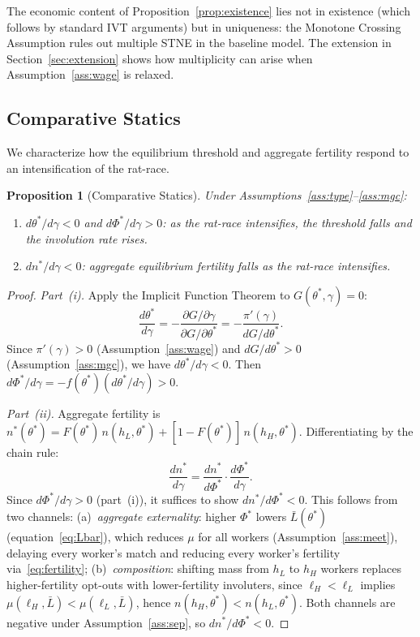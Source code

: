 \documentclass[12pt]{article}
\theoremstyle{plain}
\newtheorem{proposition}{Proposition}
\theoremstyle{definition}
\theoremstyle{remark}
\newcommand{\tstar}{\theta^{*}}
\newcommand{\Lbar}{\bar{L}}
\newcommand{\hH}{h_{H}}
\newcommand{\hL}{h_{L}}
\newcommand{\ellH}{\ell_{H}}
\newcommand{\ellL}{\ell_{L}}
\newcommand{\Phistar}{\Phi^{*}}
\begin{document}
The economic content of Proposition~\ref{prop:existence} lies not in existence (which
follows by standard IVT arguments) but in uniqueness: the Monotone Crossing
Assumption rules out multiple STNE in the baseline model.  The extension in
Section~\ref{sec:extension} shows how multiplicity can arise when
Assumption~\ref{ass:wage} is relaxed.

\subsection{Comparative Statics}

We characterize how the equilibrium threshold and aggregate fertility respond to an
intensification of the rat-race.

\begin{proposition}[Comparative Statics]
\label{prop:cs}
Under Assumptions~\ref{ass:type}--\ref{ass:mgc}:
\begin{enumerate}
  \item[\textup{(i)}] $d\tstar/d\gamma < 0$ and $d\Phistar/d\gamma > 0$:
    as the rat-race intensifies, the threshold falls and the involution rate rises.
  \item[\textup{(ii)}] $dn^{*}/d\gamma < 0$:
    aggregate equilibrium fertility falls as the rat-race intensifies.
\end{enumerate}
\end{proposition}

\begin{proof}
\emph{Part~(i).}  Apply the Implicit Function Theorem to $G(\tstar,\gamma) = 0$:
\[
  \frac{d\tstar}{d\gamma}
  = -\frac{\partial G/\partial\gamma}{\partial G/\partial\tstar}
  = -\frac{\pi'(\gamma)}{dG/d\tstar}.
\]
Since $\pi'(\gamma) > 0$ (Assumption~\ref{ass:wage}) and $dG/d\tstar > 0$
(Assumption~\ref{ass:mgc}), we have $d\tstar/d\gamma < 0$.  Then
$d\Phistar/d\gamma = -f(\tstar)(d\tstar/d\gamma) > 0$.

\emph{Part~(ii).}  Aggregate fertility is
$n^{*}(\tstar) = F(\tstar)\,n(\hL,\tstar) + [1-F(\tstar)]\,n(\hH,\tstar)$.
Differentiating by the chain rule:
\[
  \frac{dn^{*}}{d\gamma}
  = \frac{dn^{*}}{d\Phistar} \cdot \frac{d\Phistar}{d\gamma}.
\]
Since $d\Phistar/d\gamma > 0$ (part~(i)), it suffices to show
$dn^{*}/d\Phistar < 0$.  This follows from two channels:
(a)~\emph{aggregate externality}: higher $\Phistar$ lowers $\Lbar(\tstar)$
(equation~\eqref{eq:Lbar}), which reduces $\mu$ for all workers
(Assumption~\ref{ass:meet}), delaying every worker's match and reducing every
worker's fertility via~\eqref{eq:fertility};
(b)~\emph{composition}: shifting mass from $\hL$ to $\hH$ workers replaces
higher-fertility opt-outs with lower-fertility involuters, since
$\ell_{H} < \ell_{L}$ implies $\mu(\ellH,\Lbar) < \mu(\ellL,\Lbar)$, hence
$n(\hH,\tstar) < n(\hL,\tstar)$.  Both channels are negative under
Assumption~\ref{ass:sep}, so $dn^{*}/d\Phistar < 0$.
\end{proof}
\end{document}
